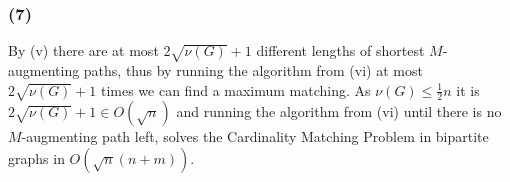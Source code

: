 \documentclass{article}
\begin{document}
\subsubsection*{(7)} By (v) there are at most $2\sqrt{\nu(G)}+1$ different lengths of shortest $M$-augmenting paths, thus by running the algorithm from (vi) at most $2\sqrt{\nu(G)}+1$ times we can find a maximum matching. As $\nu(G)\leq \frac 12 n$ it is  $2\sqrt{\nu(G)}+1\in O(\sqrt n)$ and running the algorithm from (vi) until there is no $M$-augmenting path left, solves the Cardinality Matching Problem in bipartite graphs in $O(\sqrt n (n+m))$.
\end{document}
